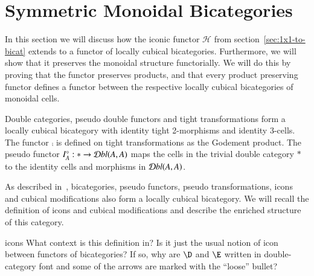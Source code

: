 \section{Symmetric Monoidal Bicategories}
\label{sec:constr-symm-mono}

In this section we will discuss how the iconic functor $\mathcal{H}$ from section~\ref{sec:1x1-to-bicat} extends to a functor of locally cubical bicategories. Furthermore, we will show that it preserves the monoidal structure functorially. We will do this by proving that the functor preserves products, and that every product preserving functor defines a functor between the respective locally cubical bicategories of monoidal cells. 

Double categories, pseudo double functors and tight transformations form a locally cubical bicategory with identity tight 2-morphisms and identity 3-cells. The functor $\comp$ is defined on tight transformations as the Godement product. The pseudo functor $I^{\circ}_A: * \rightarrow \mathcal{D} bl(A,A)$ maps the cells in the trivial double category $*$ to the identity cells and morphisms in $\mathcal{D} bl(A,A)$. 

As described in~\cite{gg:ldstr-tricat}, bicategories, pseudo functors, pseudo transformations, icons and cubical modifications also form a locally cubical bicategory. We will recall the definition of icons and cubical modifications and describe the enriched structure of this category.

\begin{anfxnote}[author=MS]{icons}
  What context is this definition in?
  Is it just the usual notion  of icon between functors of bicategories?
  If so, why are $\D$ and $\E$ written in double-category font and some of the arrows are marked with the ``loose'' bullet?
\end{anfxnote}

